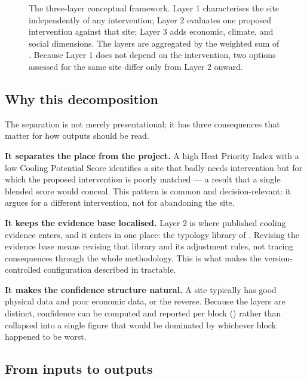 \begin{figure}[htbp]
\centering
\resizebox{\textwidth}{!}{}
\caption[The three-layer conceptual framework]{The three-layer conceptual
framework. Layer 1 characterises the site independently of any intervention;
Layer 2 evaluates one proposed intervention against that site; Layer 3 adds
economic, climate, and social dimensions. The layers are aggregated by the
weighted sum of . Because Layer 1 does not depend on the
intervention, two options assessed for the same site differ only from Layer 2
onward.}
\label{fig:framework}
\end{figure}

\subsection{Why this decomposition}

The separation is not merely presentational; it has three consequences that
matter for how outputs should be read.

\textbf{It separates the place from the project.} A high Heat Priority Index
with a low Cooling Potential Score identifies a site that badly needs
intervention but for which the proposed intervention is poorly matched --- a
result that a single blended score would conceal. This pattern is common and
decision-relevant: it argues for a different intervention, not for abandoning
the site.

\textbf{It keeps the evidence base localised.} Layer 2 is where published
cooling evidence enters, and it enters in one place: the typology library of
. Revising the evidence base means revising that library
and its adjustment rules, not tracing consequences through the whole
methodology. This is what makes the version-controlled configuration described
in  tractable.

\textbf{It makes the confidence structure natural.} A site typically has good
physical data and poor economic data, or the reverse. Because the layers are
distinct, confidence can be computed and reported per block
() rather than collapsed into a single figure that would
be dominated by whichever block happened to be worst.

\subsection{From inputs to outputs}

